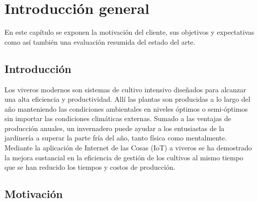 
\chapter{Introducción general} %

\label{Chapter1} %
\label{IntroGeneral}


\newcommand{\keyword}[1]{\textbf{#1}}
\newcommand{\tabhead}[1]{\textbf{#1}}
\newcommand{\code}[1]{\texttt{#1}}
\newcommand{\file}[1]{\texttt{\bfseries#1}}
\newcommand{\option}[1]{\texttt{\itshape#1}}
\newcommand{\grados}{$^{\circ}$}


En este capítulo se exponen la motivación del cliente, sus objetivos y expectativas como así también una evaluación resumida del estado del arte.
\section{Introducción}
\label{Introducción}
Los viveros modernos son sistemas de cultivo intensivo diseñados para alcanzar una alta eficiencia y productividad. Allí las plantas son producidas a lo largo del año manteniendo las condiciones ambientales en niveles óptimos o semi-óptimos sin importar las condiciones climáticas externas. \citep{HistoryofControlledEnvironmentHorticultureGreenhouses}
Sumado a las ventajas de producción anuales, un invernadero puede ayudar a los entusiastas de la jardinería a superar la parte fría del año, tanto física como mentalmente. \citep{GreenHousesForHomeOwnersAndGardeners} \\
Mediante la aplicación de Internet de las Cosas (IoT) a viveros se ha demostrado la mejora sustancial en la eficiencia de gestión de los cultivos al mismo tiempo que se han reducido los tiempos y costos de producción. \citep{IoTparaInvernaderos}

\section{Motivación}
\label{Motivación}

